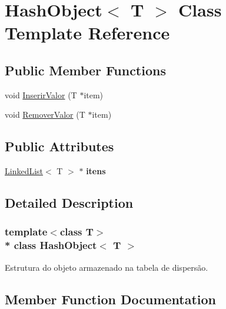 \hypertarget{class_hash_object}{}\section{Hash\+Object$<$ T $>$ Class Template Reference}
\label{class_hash_object}
\subsection*{Public Member Functions}
\begin{DoxyCompactItemize}
\item 
void \hyperlink{class_hash_object_acd54a12a00a1bf145c6b1b6549b1ba31}{Inserir\+Valor} (T $\ast$item)
\item 
void \hyperlink{class_hash_object_a1cd7c30e227a9b8503c03a8d8efa58aa}{Remover\+Valor} (T $\ast$item)
\end{DoxyCompactItemize}
\subsection*{Public Attributes}
\begin{DoxyCompactItemize}
\item 
\hyperlink{class_linked_list}{Linked\+List}$<$ T $>$ $\ast$ {\bfseries itens}\hypertarget{class_hash_object_a9f995d3d00a3e4c257ecef627ee8dcf0}{}\label{class_hash_object_a9f995d3d00a3e4c257ecef627ee8dcf0}

\end{DoxyCompactItemize}


\subsection{Detailed Description}
\subsubsection*{template$<$class T$>$\\*
class Hash\+Object$<$ T $>$}

Estrutura do objeto armazenado na tabela de dispersão. 

\subsection{Member Function Documentation}
